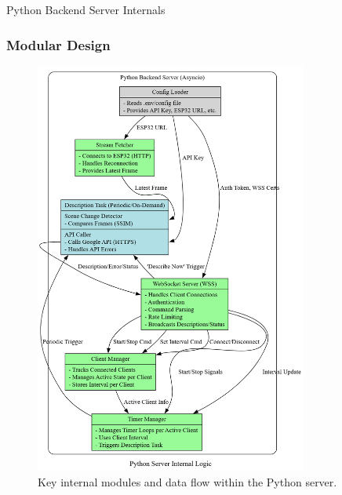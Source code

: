 \documentclass{beamer}
\begin{document}
\begin{frame}{Python Backend Server Internals}
    \frametitle{Modular Design}
     \begin{figure}
        \centering
        \includegraphics[height=0.8\textheight, width=0.8\textwidth, keepaspectratio]{Python_Server_Internal_Logic_Diagram.png} %
        \caption{Key internal modules and data flow within the Python server.}
    \end{figure}
\end{frame}
\end{document}
